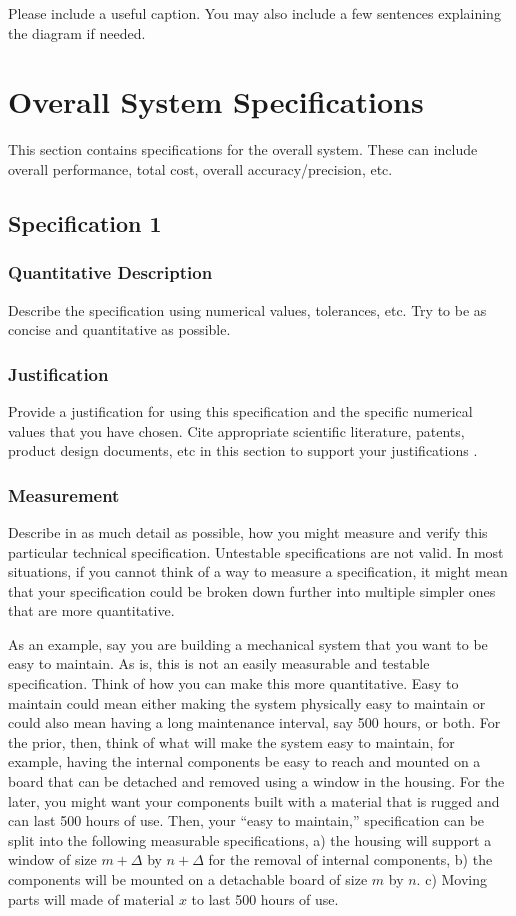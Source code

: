 \documentclass[11pt, oneside]{article}   	%
\begin{document}
Please include a useful caption. You may also include a few sentences explaining the diagram if needed.

\clearpage  %


\section{Overall System Specifications}
This section contains specifications for the overall system. These can include overall performance, total cost, overall accuracy/precision, etc.
\subsection{Specification 1}
\subsubsection{Quantitative Description}
Describe the specification using numerical values, tolerances, etc. Try to be as concise and quantitative as possible.
\subsubsection{Justification}
Provide a justification for using this specification and the specific numerical values that you have chosen. Cite appropriate scientific literature, patents, product design documents, etc in this section to support your justifications \cite{item1}.
\subsubsection{Measurement}
Describe in as much detail as possible, how you might measure and verify this particular technical specification. Untestable specifications are not valid. In most situations, if you cannot think of a way to measure a specification, it might mean that your specification could be broken down further into multiple simpler ones that are more quantitative. 

As an example, say you are building a mechanical system that you want to be easy to maintain. As is, this is not an easily measurable and testable specification. Think of how you can make this more quantitative. Easy to maintain could mean either making the system physically easy to maintain or could also mean having a long maintenance interval, say 500 hours, or both. For the prior, then, think of what will make the system easy to maintain, for example, having the internal components be easy to reach and mounted on a board that can be detached and removed using a window in the housing. For the later, you might want your components built with a material that is rugged and can last 500 hours of use. Then, your ``easy to maintain,'' specification can be split into the following measurable specifications, a) the housing will support a window of size $m+\Delta$ by $n+\Delta$ for the removal of internal components, b) the components will be mounted on a detachable board of size $m$ by $n$. c) Moving parts will made of material $x$ to last 500 hours of use.
\end{document}
